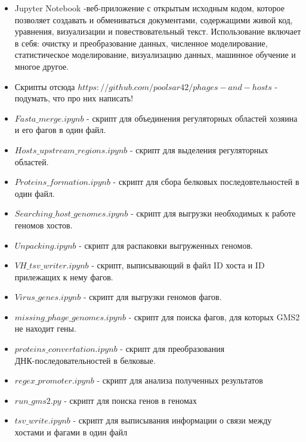 \documentclass[14pt]{extarticle}
\begin{document}
\begin{itemize}
    \item Jupyter Notebook -веб-приложение с открытым исходным кодом, которое позволяет создавать и обмениваться
    документами, содержащими живой код, уравнения, визуализации и повествовательный текст. Использование включает в 
    себя:
    очистку и преобразование данных, численное моделирование, статистическое моделирование, визуализацию данных, 
    машинное
    обучение и многое другое. \cite{jupyter}
    
    \item Скрипты отсюда \(https://github.com/poolsar42/phages-and-hosts\) - подумать, что про них написать!
    \cite{github}
    
    \item \(Fasta\_merge.ipynb\) - скрипт для объединения регуляторных областей хозяина и его фагов в один файл.
    \item \(Hosts\_upstream\_regions.ipynb\) - скрипт для выделения регуляторных областей.
    \item \(Proteins\_formation.ipynb\) - скрипт для сбора белковых последовтельностей в один файл.
    \item \(Searching\_host\_genomes.ipynb\) - скрипт для выгрузки необходимых к работе геномов хостов.
    \item \(Unpacking.ipynb\) - скрипт для распаковки выгруженных геномов.
    \item \(VH\_tsv\_writer.ipynb\) - скрипт, выписывающий в файл ID хоста и ID прилежащих к нему фагов.
    \item \(Virus\_genes.ipynb\) - скрипт для выгрузки геномов фагов.
    \item \(missing\_phage\_genomes.ipynb\) - скрипт для поиска фагов, для которых GMS2 не находит гены.
    \item \(proteins\_convertation.ipynb \) - скрипт для преобразования \\ ДНК-последовательностей
                                в белковые.
    \item \(regex\_promoter.ipynb \) - скрипт для анализа полученных результатов
    \item \(run\_gms2.py\) - скрипт для поиска генов в геномах
    \item \(tsv\_write.ipynb\) - скрипт для выписывания информации о связи между хостами и фагами в один файл
\end{itemize}
\end{document}
